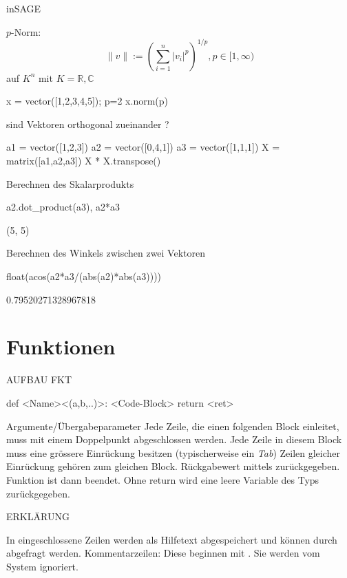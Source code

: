 \documentclass[fontsize=12pt,paper=a4,twoside,bibtotoc,idxtotoc,
liststotoc,pagesize,BCOR1.2cm,DIV15,chapterprefix,pagesize=pdftex]{scrbook}
\theoremstyle{plain}
\theoremstyle{definition}
\theoremstyle{remark}
\begin{document}
inSAGE


 $p$-Norm:
\[
\|v\|:=(\sum_{i=1}^n |v_i|^p)^{1/p}, p\in [1,\infty)                   
\]
auf $K^n$ mit $K=\mathbb{R},\mathbb{C}$
\begin{sagein}
x = vector([1,2,3,4,5]); p=2
x.norm(p)
\end{sagein}
 sind Vektoren orthogonal zueinander ?
\begin{sagein}
a1 = vector([1,2,3])
a2 = vector([0,4,1])
a3 = vector([1,1,1])
X = matrix([a1,a2,a3])
X * X.transpose() 
\end{sagein}
 Berechnen des Skalarprodukts
\begin{sagein}
a2.dot_product(a3), a2*a3
\end{sagein}
\begin{sage}
  (5, 5)
\end{sage}
 Berechnen des Winkels zwischen zwei Vektoren
\begin{sagein}
float(acos(a2*a3/(abs(a2)*abs(a3))))
\end{sagein}
\begin{sage}
  0.79520271328967818
\end{sage}


\section{Funktionen}
AUFBAU FKT

\begin{sagein}
def <Name><(a,b,..)>:
    <Code-Block>
    return <ret>
\end{sagein}

 Argumente/Übergabeparameter  
 Jede Zeile, die einen folgenden Block einleitet, muss mit einem Doppelpunkt \isage{:} abgeschlossen werden.
 Jede Zeile in diesem Block muss eine grössere Einrückung besitzen (typischerweise ein \emph{Tab})
 Zeilen gleicher Einrückung gehören zum gleichen Block.
 Rückgabewert  mittels  zurückgegeben. Funktion ist dann beendet.
 Ohne return wird eine leere Variable des Typs  zurückgegeben.  


ERKLÄRUNG


 In  eingeschlossene Zeilen werden als Hilfetext abgespeichert und können durch  abgefragt werden.
 Kommentarzeilen: Diese beginnen mit \isage{#}. Sie werden vom System ignoriert.
\end{document}
